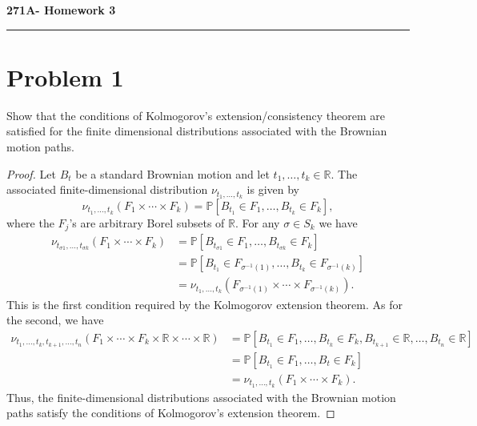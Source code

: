 \documentclass[11pt,letterpaper]{report}
\newcommand{\reals}{\mathbb{R}}
\newcommand{\Prob}{\mathbb{P}}
\begin{document}
\begin{center}
{\bf \Large 271A- Homework 3}
\vspace{0.2cm}
\hrule
\end{center}

\section*{Problem 1}
Show that the conditions of Kolmogorov's extension/consistency theorem are satisfied for the finite dimensional distributions associated with the Brownian motion paths.
\begin{proof}
	Let $B_t$ be a standard Brownian motion and let $t_1, \ldots, t_k\in \reals$. The associated finite-dimensional distribution $\nu_{t_1, \ldots, t_k}$ is given by
	\[
	\nu_{t_1, \ldots, t_k}(F_1\times \cdots \times F_k) = \Prob[B_{t_1}\in F_1,\ldots, B_{t_k}\in F_k],
	\]
	where the $F_j$'s are arbitrary Borel subsets of $\reals$. For any $\sigma\in S_k$ we have
	\begin{align*}
		\nu_{t_{\sigma 1}, \ldots, t_{\sigma k}}(F_1\times \cdots \times F_k) &= \Prob[B_{t_{\sigma 1}}\in  F_1, \ldots, B_{t_{\sigma k}}\in F_k]\\
		&= \Prob[B_{t_1}\in F_{\sigma^{-1}(1)}, \ldots, B_{t_k}\in F_{\sigma^{-1}(k)}]\\
		&= \nu_{t_1, \ldots, t_k}(F_{\sigma^{-1}(1)}\times \cdots \times F_{\sigma^{-1}(k)}).
	\end{align*}
	This is the first condition required by the Kolmogorov extension theorem. As for the second, we have
	\begin{align*}
		\nu_{t_1, \ldots, t_k, t_{k+1}, \ldots, t_n}(F_1\times \cdots\times F_k\times \reals\times \cdots \times \reals) &= \Prob[B_{t_1}\in F_1, \ldots, B_{t_k}\in F_k, B_{t_{k+1}}\in \reals, \ldots, B_{t_n}\in \reals]\\
		&= \Prob[B_{t_1}\in F_1, \ldots, B_{t}\in F_k]\\
		&= \nu_{t_1, \ldots, t_k}(F_1\times \cdots \times F_k).
	\end{align*}
	Thus, the finite-dimensional distributions associated with the Brownian motion paths satisfy the conditions of Kolmogorov's extension theorem.
\end{proof}
\end{document}
